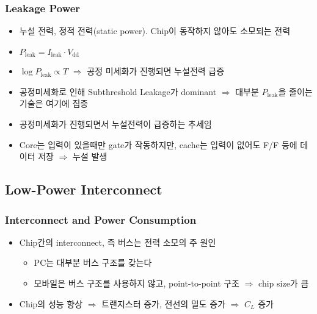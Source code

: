 \subsubsection*{Leakage Power}
\begin{itemize}
    \item 누설 전력, 정적 전력(static power). Chip이 동작하지 않아도 소모되는 전력
    \item $P_{\mathrm{leak}} = I_{\mathrm{leak}} \cdot V_{\mathrm{dd}}$
    \item $\log P_{\mathrm{leak}} \varpropto T$ $\Rightarrow$ 공정 미세화가 진행되면 누설전력 급증
    \item 공정미세화로 인해 Subthreshold Leakage가 dominant $\Rightarrow$ 대부분 $P_{\mathrm{leak}}$을 줄이는 기술은 여기에 집중
    \begin{figures}
    \end{figures}
    \item 공정미세화가 진행되면서 누설전력이 급증하는 추세임
    \item Core는 입력이 있을때만 gate가 작동하지만, cache는 입력이 없어도 F/F 등에 데이터 저장 $\Rightarrow$ 누설 발생
\end{itemize}
\newpage

\subsection{Low-Power Interconnect}

\subsubsection*{Interconnect and Power Consumption}
\begin{itemize}
    \item Chip간의 interconnect, 즉 버스는 전력 소모의 주 원인
    \begin{itemize}
        \item PC는 대부분 버스 구조를 갖는다
        \item 모바일은 버스 구조를 사용하지 않고, point-to-point 구조 $\Rightarrow$ chip size가 큼
    \end{itemize}
    \item Chip의 성능 향상 $\Rightarrow$ 트랜지스터 증가, 전선의 밀도 증가 $\Rightarrow$ $C_L$ 증가
\end{itemize}

